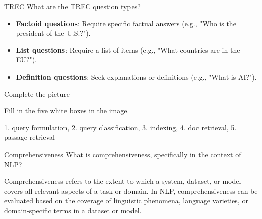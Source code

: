 \documentclass{article}
\begin{document}
\begin{exercise}{TREC}\label{ex:trec}
  What are the TREC question types?

  \begin{solution}
    \begin{itemize}
        \item \textbf{Factoid questions}: Require specific factual answers (e.g., "Who is the president of the U.S.?").
        \item \textbf{List questions}: Require a list of items (e.g., "What countries are in the EU?").
        \item \textbf{Definition questions}: Seek explanations or definitions (e.g., "What is AI?").
    \end{itemize}
  \end{solution}
\end{exercise}

\begin{exercise}{Complete the picture}
  

  Fill in the five white boxes in the image.

  \begin{solution}
    1. query formulation, 2. query classification, 3. indexing, 4. doc retrieval, 5. passage retrieval
  \end{solution}
\end{exercise}



\setcounter{section}{2020}

\begin{exercise}{Comprehensiveness}
  What is comprehensiveness, specifically in the context of NLP?

  \begin{solution}
    Comprehensiveness refers to the extent to which a system, dataset, or model covers all relevant aspects of a task or domain.
    In NLP, comprehensiveness can be evaluated based on the coverage of linguistic phenomena, language varieties, or domain-specific terms in a dataset or model.
  \end{solution}
\end{exercise}
\end{document}
